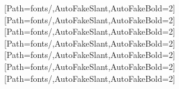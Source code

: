 
\renewcommand{\algorithmicrequire}{\textbf{输入:}}
\renewcommand{\algorithmicensure}{\textbf{输出:}}


[Path=fonts/,AutoFakeSlant,AutoFakeBold={2}]     %
\newcommand{\song}{\CJKfamily{song}}                                                    %
[Path=fonts/,AutoFakeSlant,AutoFakeBold={2}]       %
\newcommand{\hei}{\CJKfamily{hei}}                                                      %
[Path=fonts/,AutoFakeSlant,AutoFakeBold={2}]      %
\newcommand{\kai}{\CJKfamily{kai}}                                                      %
[Path=fonts/,AutoFakeSlant,AutoFakeBold={2}]          %
\newcommand{\li}{\CJKfamily{li}}                                                        %
[Path=fonts/,AutoFakeSlant,AutoFakeBold={2}]
[Path=fonts/,AutoFakeSlant,AutoFakeBold={2}]
[Path=fonts/,AutoFakeSlant,AutoFakeBold={2}]


